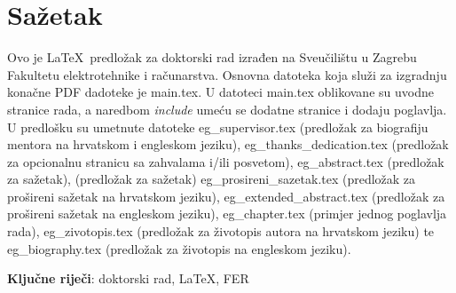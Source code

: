 \thispagestyle{empty}


\section*{Sažetak}

Ovo je \LaTeX\ predložak za doktorski rad izrađen na Sveučilištu u Zagrebu
Fakultetu elektrotehnike i računarstva. Osnovna datoteka  koja služi za
izgradnju konačne PDF dadoteke je main.tex. U datoteci main.tex oblikovane su
uvodne stranice rada, a naredbom \textit{include} umeću se dodatne stranice i
dodaju poglavlja. U predlošku su umetnute datoteke eg\_supervisor.tex
(predložak za biografiju mentora na hrvatskom i engleskom jeziku),
eg\_thanks\_dedication.tex (predložak za opcionalnu stranicu sa zahvalama i/ili
posvetom), eg\_abstract.tex (predložak za sažetak), (predložak za sažetak)
eg\_prosireni\_sazetak.tex (predložak za prošireni sažetak na hrvatskom
jeziku), eg\_extended\_abstract.tex (predložak za prošireni sažetak na
engleskom jeziku), eg\_chapter.tex (primjer jednog poglavlja rada),
eg\_zivotopis.tex (predložak za životopis autora na hrvatskom jeziku) te
eg\_biography.tex (predložak za životopis na engleskom jeziku).

\vspace{1cm}
\textbf{Ključne riječi}:  doktorski rad, \LaTeX, FER
